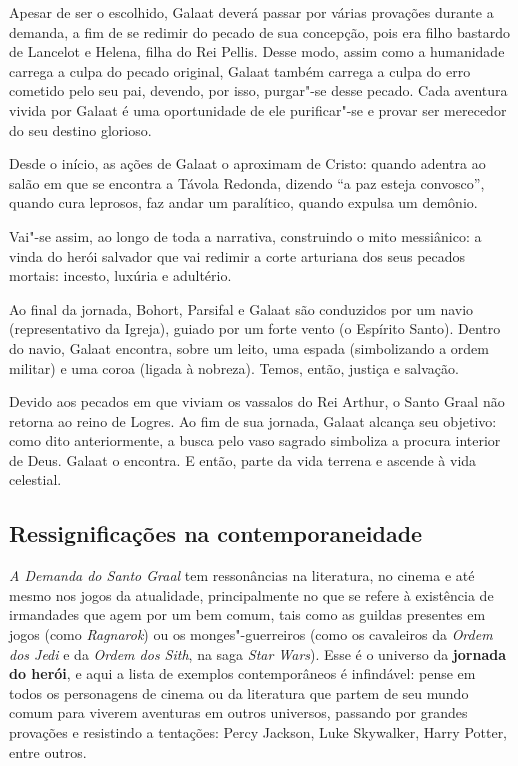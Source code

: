 \documentclass[11pt]{extarticle}
\begin{document}
Apesar de ser o escolhido, Galaat deverá passar por várias
provações durante a demanda, a fim de se redimir do pecado de sua
concepção, pois era filho bastardo de Lancelot e Helena, filha do Rei
Pellis. Desse modo, assim como a humanidade carrega a culpa do pecado
original, Galaat também carrega a culpa do erro cometido pelo seu pai,
devendo, por isso, purgar"-se desse pecado. Cada aventura vivida por
Galaat é uma oportunidade de ele purificar"-se e provar ser merecedor do
seu destino glorioso.

Desde o início, as ações de Galaat o aproximam de Cristo:
quando adentra ao salão em que se encontra a Távola Redonda, dizendo ``a
paz esteja convosco'', quando cura leprosos, faz andar um paralítico,
quando expulsa um demônio.

Vai"-se assim, ao longo de toda a narrativa, construindo o mito
messiânico: a vinda do herói salvador que vai redimir a corte arturiana
dos seus pecados mortais: incesto, luxúria e
adultério.

Ao final da jornada, Bohort, Parsifal e Galaat são conduzidos
por um navio (representativo da Igreja), guiado por um forte vento (o
Espírito Santo). Dentro do navio, Galaat encontra, sobre um leito, uma
espada (simbolizando a ordem militar) e uma coroa (ligada à nobreza).
Temos, então, justiça e
salvação.

Devido aos pecados em que viviam os vassalos do Rei Arthur, o
Santo Graal não retorna ao reino de Logres. Ao fim de sua jornada,
Galaat alcança seu objetivo: como dito anteriormente, a busca pelo vaso
sagrado simboliza a procura interior de Deus. Galaat o encontra. E
então, parte da vida terrena e ascende à vida
celestial.

\subsection{Ressignificações na contemporaneidade}

\emph{A Demanda do Santo Graal} tem ressonâncias na literatura, no
cinema e até mesmo nos jogos da atualidade, principalmente no que se
refere à existência de irmandades que agem por um bem comum, tais como
as guildas presentes em jogos (como \emph{Ragnarok}) ou os
monges"-guerreiros (como os cavaleiros da \emph{Ordem dos Jedi} e da
\emph{Ordem dos Sith}, na saga \emph{Star Wars}). Esse é o universo da
\textbf{jornada do herói}, e aqui a lista de exemplos contemporâneos é
infindável: pense em todos os personagens de cinema ou da literatura que
partem de seu mundo comum para viverem aventuras em outros universos,
passando por grandes provações e resistindo a tentações: Percy Jackson,
Luke Skywalker, Harry Potter, entre outros.
\end{document}
